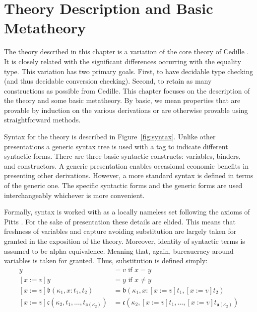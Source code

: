 \chapter{Theory Description and Basic Metatheory}


The theory described in this chapter is a variation of the core theory of Cedille \cite{stump2021_cedillecore}.
It is closely related with the significant differences occurring with the equality type.
This variation has two primary goals.
First, to have decidable type checking (and thus decidable conversion checking).
Second, to retain as many constructions as possible from Cedille.
This chapter focuses on the description of the theory and some basic metatheory.
By basic, we mean properties that are provable by induction on the various derivations or are otherwise provable using straightforward methods.

Syntax for the theory is described in Figure~\ref{fig:syntax}.
Unlike other presentations a generic syntax tree is used with a tag to indicate different syntactic forms.
There are three basic syntactic constructs: variables, binders, and constructors.
A generic presentation enables occasional economic benefits in presenting other derivations.
However, a more standard syntax is defined in terms of the generic one.
The specific syntactic forms and the generic forms are used interchangeably whichever is more convenient.



Formally, syntax is worked with as a locally nameless set following the axioms of Pitts \cite{2023pitts_lns}.
For the sake of presentation these details are elided.
This means that freshness of variables and capture avoiding substitution are largely taken for granted in the exposition of the theory.
Moreover, identity of syntactic terms is assumed to be alpha equivalence.
Meaning that, again, bureaucracy around variables is taken for granted.
Thus, substitution is defined simply:
\begin{align*}
    [x := v]y &= v \text{ if }x = y \\
    [x := v]y &= y \text{ if }x \neq y \\
    [x := v]\mathfrak{b}(\kappa_1, x : t_1, t_2) &= \mathfrak{b}(\kappa_1, x : [x := v]t_1, [x := v]t_2) \\
    [x := v]\mathfrak{c}(\kappa_2, t_1, \ldots, t_{\mathfrak{a}(\kappa_2)}) &= \mathfrak{c}(\kappa_2, [x := v]t_1, \ldots, [x := v]t_{\mathfrak{a}(\kappa_2)})
\end{align*}









